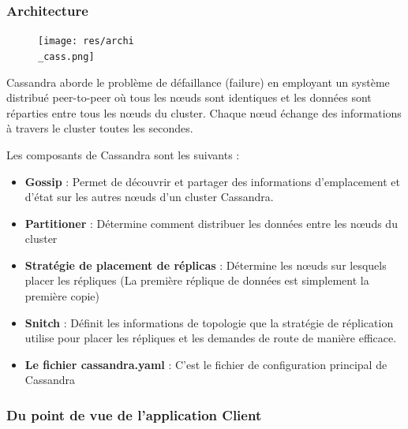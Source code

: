 \documentclass[a4paper, 11pt, titlepage]{article}
\begin{document}
\setlength{\intextsep}{0pt}

\subsubsection* {Architecture}

\begin{figure}
\texttt{[image: res/archi\\\_cass.png]}
\end{figure}

Cassandra aborde le problème de défaillance (failure) en employant un système distribué peer-to-peer où tous les nœuds sont identiques et les données sont réparties entre tous les nœuds du cluster.
Chaque nœud échange des informations à travers le cluster toutes les secondes.

\vspace{5mm}

Les composants de Cassandra sont les suivants :

\begin{itemize}

\item
\textbf{Gossip} : Permet de découvrir et partager des informations d'emplacement et d'état sur les autres nœuds d'un cluster Cassandra.

\item
\textbf{Partitioner} : Détermine comment distribuer les données entre les nœuds du cluster

\item
\textbf{Stratégie de placement de réplicas} : Détermine les nœuds sur lesquels placer les répliques (La première réplique de données est simplement la première copie)

\item
\textbf{Snitch} : Définit les informations de topologie que la stratégie de réplication utilise pour placer les répliques et les demandes de route de manière efficace.

\item
\textbf{Le fichier cassandra.yaml} : C'est le fichier de configuration principal de Cassandra

\end{itemize}



\subsubsection* {Du point de vue de l'application Client}
\end{document}

